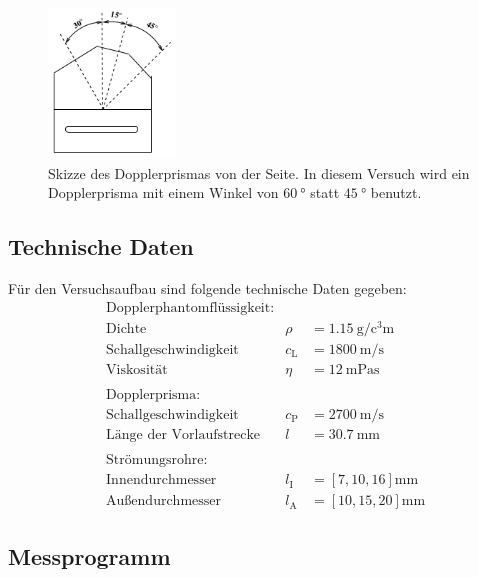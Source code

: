 \begin{figure}
  \centering
  \includegraphics[height=4cm]{Dopplerprisma.png}
  \caption{Skizze des Dopplerprismas von der Seite. In diesem Versuch wird ein
  Dopplerprisma mit einem Winkel von $\SI{60}{\degree}$ statt $\SI{45}{\degree}$
  benutzt. \cite{anleitung}}
  \label{fig:Dopplerprisma}
\end{figure}

\subsection{Technische Daten}

Für den Versuchsaufbau sind folgende technische Daten gegeben:
\begin{align*}
  & \text{Dopplerphantomflüssigkeit:} \\
  & \text{Dichte} & \rho & = \SI{1.15}{\gram\per\cubic\centi\meter} \\
  & \text{Schallgeschwindigkeit} & c_\text{L} & = \SI{1800}{\meter\per\second} \\
  & \text{Viskosität} & \eta & = \SI{12}{\milli\pascal\second} \\ \\
  & \text{Dopplerprisma:} \\
  & \text{Schallgeschwindigkeit} & c_\text{P} & = \SI{2700}{\meter\per\second} \\
  & \text{Länge der Vorlaufstrecke} & l & = \SI{30.7}{\milli\meter} \\ \\
  & \text{Strömungsrohre:} \\
  & \text{Innendurchmesser} & l_\text{I} & = [7, 10, 16]\si{\milli\meter} \\
  & \text{Außendurchmesser} & l_\text{A} & = [10, 15, 20]\si{\milli\meter}
\end{align*}

\subsection{Messprogramm}
